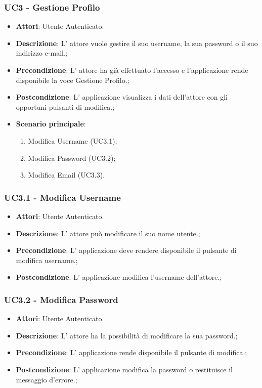 \subsubsection{UC3 - Gestione Profilo} 
\label{sssec:UC3} 
\begin{itemize} 
\item \textbf{Attori}: Utente Autenticato.
\item \textbf{Descrizione}: L' attore vuole gestire il suo username, la sua password o il suo indirizzo e-mail.;
\item \textbf{Precondizione}: L' attore ha già effettuato l'accesso e l'applicazione rende disponibile la voce Gestione Profilo.;
\item \textbf{Postcondizione}: L' applicazione visualizza i dati dell'attore con gli opportuni pulsanti di modifica.;
\item \textbf{Scenario principale}: \begin{enumerate}\item Modifica Username (UC3.1);\item Modifica Password (UC3.2);\item Modifica Email (UC3.3). 
 \end{enumerate}
\end{itemize} 
\subsubsection{UC3.1 - Modifica Username} 
\label{sssec:UC3.1} 
\begin{itemize} 
\item \textbf{Attori}: Utente Autenticato.
\item \textbf{Descrizione}: L' attore può modificare il suo nome utente.;
\item \textbf{Precondizione}: L' applicazione deve rendere disponibile il pulsante di modifica username.;
\item \textbf{Postcondizione}: L' applicazione modifica l'username dell'attore.;
\end{itemize} 
\subsubsection{UC3.2 - Modifica Password} 
\label{sssec:UC3.2} 
\begin{itemize} 
\item \textbf{Attori}: Utente Autenticato.
\item \textbf{Descrizione}: L' attore ha la possibilità di modificare la sua password.;
\item \textbf{Precondizione}: L' applicazione rende disponibile il pulsante di modifica.;
\item \textbf{Postcondizione}: L' applicazione modifica la password o restituisce il messaggio d'errore.;
\end{itemize} 
